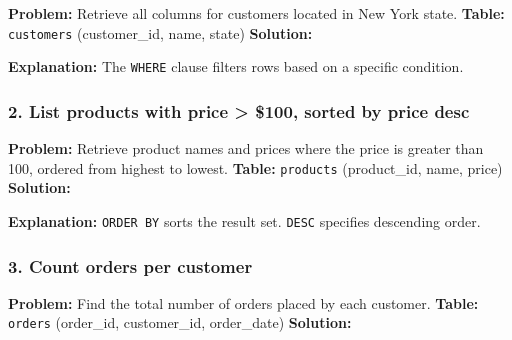 \textbf{Problem:} Retrieve all columns for customers located in New York
state. \textbf{Table:} \texttt{customers} (customer\_id, name, state)
\textbf{Solution:}

\begin{Shaded}
\begin{Highlighting}[]
 \OperatorTok{*} \OperatorTok{=} \NormalTok{;}
\end{Highlighting}
\end{Shaded}

\textbf{Explanation:} The \texttt{WHERE} clause filters rows based on a
specific condition.

\subsubsection{2. List products with price \textgreater{} \$100, sorted
by price desc}\label{list-products-with-price-100-sorted-by-price-desc}

\textbf{Problem:} Retrieve product names and prices where the price is
greater than 100, ordered from highest to lowest. \textbf{Table:}
\texttt{products} (product\_id, name, price) \textbf{Solution:}

\begin{Shaded}
\begin{Highlighting}[]
\OperatorTok{\textgreater{}}   \NormalTok{;}
\end{Highlighting}
\end{Shaded}

\textbf{Explanation:} \texttt{ORDER\ BY} sorts the result set.
\texttt{DESC} specifies descending order.

\subsubsection{3. Count orders per
customer}\label{count-orders-per-customer}

\textbf{Problem:} Find the total number of orders placed by each
customer. \textbf{Table:} \texttt{orders} (order\_id, customer\_id,
order\_date) \textbf{Solution:}

\begin{Shaded}
\begin{Highlighting}[]
 
\end{Highlighting}
\end{Shaded}

